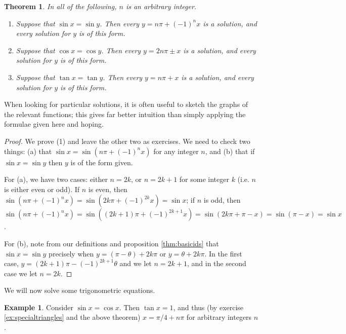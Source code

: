 \documentclass[a4paper,leqno]{article}
\newcommand{\marginsymbol}{\marginpar{\hfill(\ding{43})}}
\numberwithin{equation}{section}
\newtheorem{thm}[equation]{Theorem}
\theoremstyle{definition}
\newtheorem{ex}[equation]{Example}
\theoremstyle{remark}
\begin{document}
\begin{thm}\leavevmode\marginsymbol
  In all of the following, $n $ is an arbitrary integer.
  \begin{enumerate}
    \item Suppose that $ \sin x = \sin y $. Then every $ y = n\pi + (-1)^n x $ is a solution, and every solution for $ y $ is of this form.
    \item Suppose that $ \cos x = \cos y $. Then every $ y = 2n\pi \pm x $ is a solution, and every solution for $ y $ is of this form.
    \item Suppose that $ \tan x = \tan y $. Then every $ y = n\pi + x $ is a solution, and every solution for $ y $ is of this form.
  \end{enumerate}
\end{thm}
When looking for particular solutions, it is often useful to sketch the graphs of the relevant functions; this gives far better intuition
than simply applying the formulae given here and hoping.
\begin{proof}
  We prove (1) and leave the other two as exercises. We need to check two things: (a) that $ \sin x = \sin (n\pi + (-1)^n x) $ for any integer $ n $,
  and (b) that if $ \sin x = \sin y $ then $ y $ is of the form given.

  For (a), we have two cases: either $ n = 2k $, or $ n = 2k + 1 $ for some integer $ k $ (i.e. $ n $ is either even or odd). If $ n $ is
  even, then $ \sin(n\pi + (-1)^n x) = \sin(2k\pi + (-1)^{2k} x) = \sin x $; if $ n $ is odd,
  then $ \sin(n\pi + (-1)^n x) = \sin((2k + 1)\pi + (-1)^{2k + 1}x) = \sin(2k\pi + \pi - x) = \sin(\pi - x) = \sin x $.

  For (b), note from our definitions and proposition \ref{thm:basicids} that $ \sin x = \sin y $ precisely when $ y = (\pi - \theta) + 2k\pi $
  or $ y = \theta + 2k\pi $. In the first case, $ y = (2k + 1)\pi - (-1)^{2k + 1} \theta $ and we let $ n = 2k + 1 $, and in the second case
  we let $ n = 2k $.
\end{proof}

We will now solve some trigonometric equations.
\begin{ex}
  Consider $ \sin x = \cos x $. Then $ \tan x = 1 $, and thus (by exercise \ref{ex:specialtriangles} and the above theorem) $ x = \pi/4 + n\pi $
  for arbitrary integers $ n $.
\end{ex}
\end{document}
